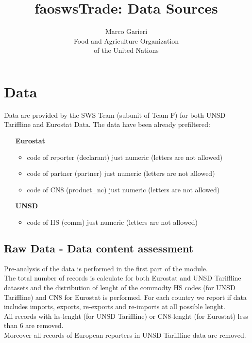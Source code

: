 \documentclass[nojss]{jss}\usepackage[]{graphicx}\usepackage[]{color}
\title{\bf faoswsTrade: Data Sources}
\author{Marco Garieri \\ Food and Agriculture Organization \\ of
  the United Nations}
\begin{document}
\newpage

%

%

\section{Data}
Data are provided by the SWS Team (subunit of Team F) for both UNSD Tariffline and Eurostat Data. The data have been already prefiltered:
\begin{itemize}
\item [\bf{Eurostat}]
\begin{itemize}
\item code of reporter (declarant) just numeric (letters are not allowed)
\item code of partner (partner) just numeric (letters are not allowed)
\item code of CN8 (product\_nc) just numeric (letters are not allowed)
\end{itemize}
\item [\bf{UNSD}]
\begin{itemize}
\item code of HS (comm) just numeric (letters are not allowed)
\end{itemize}
\end{itemize}

\subsection{Raw Data - Data content assessment}
Pre-analysis of the data is performed in the first part of the module.\\
The total number of records is calculate for both Eurostat and UNSD Tariffline datasets and the distribution of lenght of the commodty HS codes (for UNSD Tariffline) and CN8 for Eurostat is performed. For each country we report if data includes imports, exports, re-exports and re-imports at all possible lenght.\\
All records with hs-lenght (for UNSD Tariffline) or CN8-lenght (for Eurostat) less than 6 are removed.\\
Moreover all records of European reporters in UNSD Tariffline data are removed.
\end{document}
